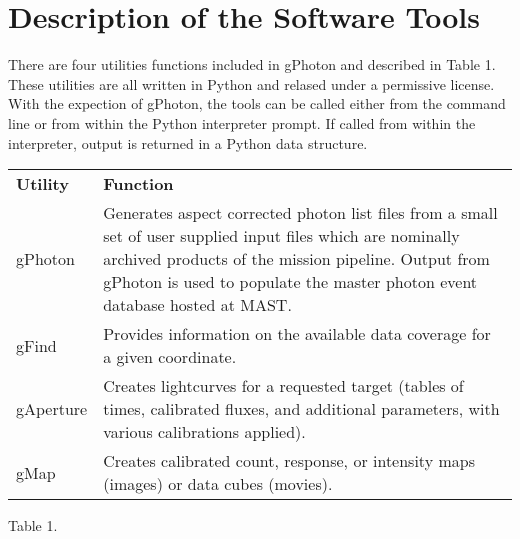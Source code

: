 \documentclass[preprint]{aastex}
\begin{document}
\section{Description of the Software Tools}
\label{softwaretools}
There are four utilities functions included in gPhoton and described in {\color{red}Table 1}. These utilities are all written in Python and relased under a permissive license. With the expection of gPhoton, the tools can be called either from the command line or from within the Python interpreter prompt. If called from within the interpreter, output is returned in a Python data structure.

\begin{tabular}{|p{2cm}|p{12cm}|}
\hline
	{\bf Utility} & {\bf Function}\\
	gPhoton & {Generates aspect corrected photon list files from a small set of user supplied input files which are nominally archived products of the mission pipeline. Output from gPhoton is used to populate the master photon event database hosted at MAST.}\\
	gFind & Provides information on the available data coverage for a given coordinate.\\
	gAperture & Creates lightcurves for a requested target (tables of times, calibrated fluxes, and additional parameters, with various calibrations applied).\\
	gMap & Creates calibrated count, response, or intensity maps (images) or data cubes (movies).\\
\hline
\end{tabular}

{\color{red}Table 1.}
\end{document}

